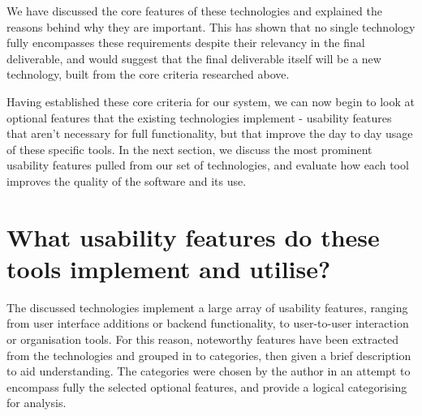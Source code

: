 We have discussed the core features of these technologies and explained the reasons behind why they are important.
This has shown that no single technology fully encompasses these requirements despite their relevancy in the final deliverable, and would suggest that the final deliverable itself will be a new technology, built from the core criteria researched above.

Having established these core criteria for our system, we can now begin to look at optional features that the existing technologies implement - usability features that aren't necessary for full functionality, but that improve the day to day usage of these specific tools.
In the next section, we discuss the most prominent usability features pulled from our set of technologies, and evaluate how each tool improves the quality of the software and its use.

\section{What usability features do these tools implement and utilise?}
The discussed technologies implement a large array of usability features, ranging from user interface additions or backend functionality, to user-to-user interaction or organisation tools.
For this reason, noteworthy features have been extracted from the technologies and grouped in to categories, then given a brief description to aid understanding.
The categories were chosen by the author in an attempt to encompass fully the selected optional features, and provide a logical categorising for analysis.

